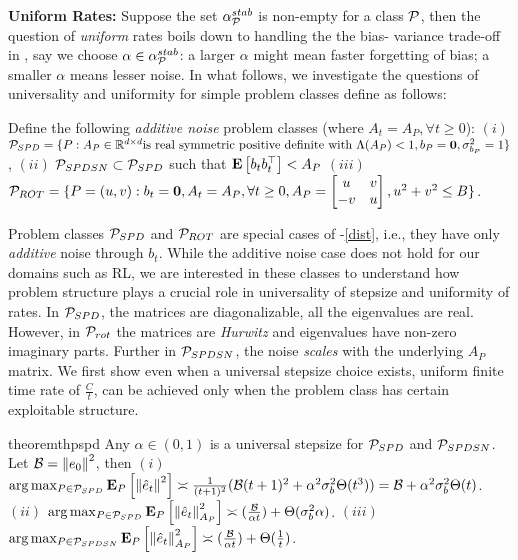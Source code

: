 \textbf{Uniform Rates:} Suppose the set $\alpha^{stab}_{\P}$ is non-empty for a class $\P$, then the question of \emph{uniform} rates boils down to handling the the bias-
variance trade-off in , say we choose $\alpha\in\alpha^{stab}_{\P}$: a larger $\alpha$ might mean faster forgetting of bias; a smaller $\alpha$ means lesser noise. In what follows, we investigate the questions of universality and uniformity for simple problem classes define as follows:
\begin{definition}
Define the following \emph{additive noise} problem classes (where $A_t=A_P,\forall t\geq 0$): $(i)$  $\P_{SPD}=\{ P: A_P\in \R^{\dcd}\text{is real symmetric positive definite with~} \Lambda(A_P)<1, b_P=\mathbf{0}, \sigma^2_{b_P}=1\}$, $(ii)$ $\P_{SPDSN}\subset \P_{SPD}$ such that $\EE{b_tb_t^\top}<A_P$ $(iii)$ $\P_{ROT}=\{P=(u,v): b_t=\mathbf{0}, A_t=A_P, \forall t\geq 0, A_P=\left[\begin{matrix} u &v \\ -v & u\end{matrix}\right], u^2+v^2\leq B\}$.
\end{definition}
Problem classes $\P_{SPD}$ and $\P_{ROT}$ are special cases of -\eqref{dist}, i.e., they have only \emph{additive} noise through $b_t$. While the additive noise case does not hold for our domains such as RL, we are interested in these classes to understand how problem structure plays a crucial role in universality of stepsize and uniformity of rates. In $\P_{SPD}$, the matrices are diagonalizable, all the eigenvalues are real. However, in $\P_{rot}$ the matrices are \emph{Hurwitz} and eigenvalues have non-zero imaginary parts. Further in $\P_{SPDSN}$, the noise \emph{scales} with the underlying $A_P$ matrix. 
We first show even when a universal stepsize choice exists, uniform finite time rate of $\frac{C}{t}$, can be achieved only when the problem class has certain exploitable structure.
\begin{restatable}{theorem}{thpspd}\label{th:pspd}
Any $\alpha\in(0,1)$ is a universal stepsize for $\P_{SPD}$ and $\P_{SPDSN}$. Let $\B=\norm{e_0}^2$, then $(i)$  $\arg\max_{P\in \P_{SPD}}\eep{\norm{\eh_t}^2}{P}\asymp\frac{1}{(t+1)^2}(\B (t+1)^2+ \alpha^2\sigma_b^2 \Theta(t^3))=\B+\alpha^2\sigma_b^2 \Theta(t)$. $(ii)$ $\arg\max_{P\in \P_{SPD}}\eep{\norm{\eh_t}^2_{A_P}}{P} \asymp (\frac{\B}{\alpha t})+\Theta(\sigma^2_b\alpha)$. $(iii)$ $\arg\max_{P\in\P_{SPDSN}}\eep{\norm{\eh_t}^2_{A_P}}{P}\asymp (\frac{\B}{\alpha t})+\Theta(\frac{1}{t})$.
\end{restatable}
